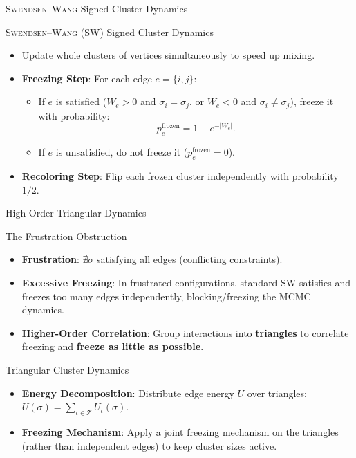 \documentclass[A4,svgnames,9pt,aspectratio=169]{beamer}
\begin{document}
\begin{frame}{\textsc{Swendsen}--\textsc{Wang} Signed Cluster Dynamics}
  \begin{block}{\textsc{Swendsen}--\textsc{Wang} (SW) Signed Cluster Dynamics \cite{SwendsenWang, EdwardsSokal}}
    \begin{itemize}
      \item Update whole clusters of vertices simultaneously to speed up mixing.
      \item \textbf{Freezing Step}: For each edge $e=\{i,j\}$:
        \begin{itemize}
          \item If $e$ is satisfied ($W_e > 0$ and $\sigma_i = \sigma_j$, or $W_e < 0$ and $\sigma_i \neq \sigma_j$), freeze it with probability:
            \begin{equation*}
                p_e^{\mathrm{frozen}} = 1 - e^{-|W_e|}.
            \end{equation*}
          \item If $e$ is unsatisfied, do not freeze it ($p_e^{\mathrm{frozen}} = 0$).
        \end{itemize}
      \item \textbf{Recoloring Step}: Flip each frozen cluster independently with probability $1/2$.
    \end{itemize}
  \end{block}
\end{frame}

\begin{frame}{High-Order Triangular Dynamics}
  \begin{block}{The Frustration Obstruction}
    \begin{itemize}
      \item \textbf{Frustration}: $\nexists \sigma$ satisfying all edges (conflicting constraints).
      \item \textbf{Excessive Freezing}: In frustrated configurations, standard SW satisfies and freezes too many edges independently, blocking/freezing the MCMC dynamics.
      \item \textbf{Higher-Order Correlation}: Group interactions into \textbf{triangles} to correlate freezing and \textbf{freeze as little as possible}.
    \end{itemize}
  \end{block}
  \begin{block}{Triangular Cluster Dynamics \textcolor{inria-2024-rouge!80!black}{\cite{BibiMonterey}}}
    \begin{itemize}
      \item \textbf{Energy Decomposition}: Distribute edge energy $U$ over triangles: $U(\sigma) = \sum_{t \in \mathcal{T}} U_t(\sigma)$.
      \item \textbf{Freezing Mechanism}: Apply a joint freezing mechanism on the triangles (rather than independent edges) to keep cluster sizes active.
    \end{itemize}
  \end{block}
\end{frame}
\end{document}
